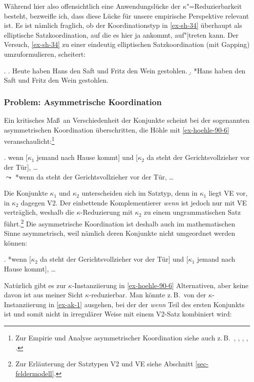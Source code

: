Während hier also offensichtlich eine Anwendungslücke der $\kappa$"=Reduzierbarkeit besteht, bezweifle ich, dass diese Lücke für unsere empirische Perspektive relevant ist. Es ist nämlich fraglich, ob der Koordinationstyp in \ref{ex-sh-34} überhaupt als elliptische Satzkoordination, auf die es hier ja ankommt, auf"|treten kann. Der Versuch, \ref{ex-sh-34} zu einer eindeutig elliptischen Satzkoordination (mit Gapping) umzuformulieren, scheitert:

\ex. 
\a. Heute haben Hans den Saft und Fritz den Wein gestohlen.
\b. *Hans haben den Saft und Fritz den Wein gestohlen. 
%


\subsubsection*{Problem: Asymmetrische Koordination}\label{sec:asymmetrische:koordination}
 
Ein kritisches Ma\ss\ an Verschiedenheit der Konjunkte scheint bei der sogenannten asymmetrischen Koordination \citep{Hoehle:90} überschritten, die Höhle mit \ref{ex-hoehle-90-6} veranschaulicht:\footnote{Zur Empirie und Analyse asymmetrischer Koordination siehe auch z.\,B.\  \cite{Wunderlich:88}, \cite{Buering:Hartmann:98}, \cite{Kathol:99}, \citet[596ff]{Sternefeld:06}, \cite{Reich:09}.} 

\ex. \label{ex-hoehle-90-6} wenn [$\kappa_1$ jemand nach Hause kommt] und [$\kappa_2$ da steht der Gerichtsvollzieher vor der Tür], \ldots \\
$\leadsto$ *wenn da steht der Gerichtsvollzieher vor der Tür, \ldots \\
\citep[(6)]{Hoehle:90}

Die Konjunkte $\kappa_1$ und $\kappa_2$ unterscheiden sich im Satztyp, denn in $\kappa_1$ liegt VE vor, in $\kappa_2$ dagegen V2. Der einbettende Komplementierer {\it wenn} ist jedoch nur mit VE verträglich, weshalb die $\kappa$-Reduzierung mit $\kappa_2$ zu einem ungrammatischen Satz führt.\footnote{Zur Erläuterung der Satztypen V2 und VE siehe Abschnitt \ref{sec-feldermodell}.} Die asymmetrische Koordination ist deshalb auch im mathematischen Sinne asymmetrisch, weil nämlich deren Konjunkte nicht umgeordnet werden können:

\ex. *wenn [$\kappa_2$ da steht der Gerichtsvollzieher vor der Tür] und [$\kappa_1$ jemand nach Hause kommt], \ldots

Natürlich gibt es zur $\kappa$-Instanziierung in \ref{ex-hoehle-90-6} Alternativen, aber keine davon ist aus meiner Sicht $\kappa$-reduzierbar. Man könnte z.\,B.\  von der $\kappa$-Instanziierung in \ref{ex-ak-1} ausgehen, bei der der  {\it wenn} Teil des ersten Konjunkts ist und somit nicht in irregulärer Weise mit einem V2-Satz kombiniert wird:

